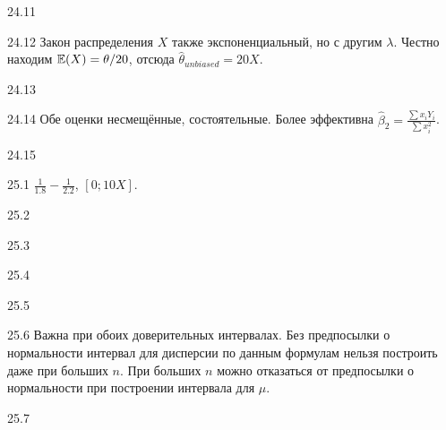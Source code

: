 \protect \hypertarget {soln:24.11}{}
\begin{solution}{{24.11}}

\end{solution}
\protect \hypertarget {soln:24.12}{}
\begin{solution}{{24.12}}
  Закон распределения $X$ также экспоненциальный, но с другим $\lambda$. Честно находим $\mathbb{E}(X)=\theta/20$, отсюда
  $\hat\theta_{unbiased} = 20X$.
\end{solution}
\protect \hypertarget {soln:24.13}{}
\begin{solution}{{24.13}}

\end{solution}
\protect \hypertarget {soln:24.14}{}
\begin{solution}{{24.14}}
Обе оценки несмещённые, состоятельные. Более эффективна $\hat{\beta}_{2}=\frac{\sum{x_{i}Y_{i}}}{\sum x_{i}^{2}}$.
\end{solution}
\protect \hypertarget {soln:24.15}{}
\begin{solution}{{24.15}}

\end{solution}
\protect \hypertarget {soln:25.1}{}
\begin{solution}{{25.1}}
  $\frac{1}{1.8} - \frac{1}{2.2}$, $[0;10X]$.
\end{solution}
\protect \hypertarget {soln:25.2}{}
\begin{solution}{{25.2}}
\end{solution}
\protect \hypertarget {soln:25.3}{}
\begin{solution}{{25.3}}
\end{solution}
\protect \hypertarget {soln:25.4}{}
\begin{solution}{{25.4}}
\end{solution}
\protect \hypertarget {soln:25.5}{}
\begin{solution}{{25.5}}
\end{solution}
\protect \hypertarget {soln:25.6}{}
\begin{solution}{{25.6}}
Важна при обоих доверительных интервалах. Без предпосылки о нормальности интервал для дисперсии по данным формулам нельзя построить даже при больших $n$. При больших $n$ можно отказаться от предпосылки о нормальности при построении интервала для $\mu$.
\end{solution}
\protect \hypertarget {soln:25.7}{}
\begin{solution}{{25.7}}
\end{solution}
\protect \hypertarget {soln:26.1}{}
